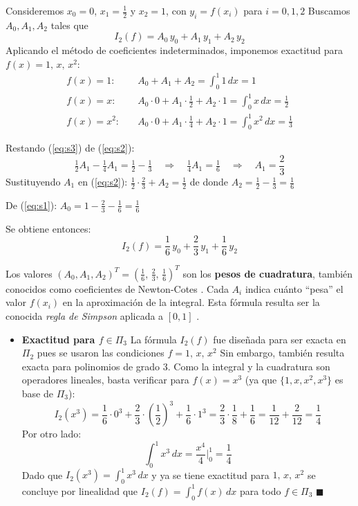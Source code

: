 \documentclass[12pt]{article}
\begin{document}
\begin{enumerate}
	Consideremos $x_0=0$, $x_1=\tfrac{1}{2}$ y $x_2=1$, con $y_i = f(x_i)$ para $i=0,1,2$ Buscamos $A_0, A_1, A_2$ tales que
	\[
	I_2(f) = A_0\,y_0 + A_1\,y_1 + A_2\,y_2
	\]
	Aplicando el método de coeficientes indeterminados, imponemos exactitud para $f(x) = 1,\, x,\, x^2$:
	\begin{align}
		f(x)=1:   &\quad A_0 + A_1 + A_2 = \int_0^1 1\,dx = 1 \label{eq:s1}\\[4pt]
		f(x)=x:   &\quad A_0\cdot 0 + A_1\cdot\tfrac{1}{2} + A_2\cdot 1 = \int_0^1 x\,dx = \tfrac{1}{2} \label{eq:s2}\\[4pt]
		f(x)=x^2: &\quad A_0\cdot 0 + A_1\cdot\tfrac{1}{4} + A_2\cdot 1 = \int_0^1 x^2\,dx = \tfrac{1}{3} \label{eq:s3}
	\end{align}

	Restando (\ref{eq:s3}) de (\ref{eq:s2}):
	\[
	\tfrac{1}{2}A_1 - \tfrac{1}{4}A_1 = \tfrac{1}{2} - \tfrac{1}{3} \quad\Longrightarrow\quad \tfrac{1}{4}A_1 = \tfrac{1}{6} \quad\Longrightarrow\quad A_1 = \frac{2}{3}
	\]
	Sustituyendo $A_1$ en (\ref{eq:s2}): $\tfrac{1}{2}\cdot\tfrac{2}{3} + A_2 = \tfrac{1}{2}$ de donde $A_2 = \tfrac{1}{2} - \tfrac{1}{3} = \tfrac{1}{6}$

	De (\ref{eq:s1}): $A_0 = 1 - \tfrac{2}{3} - \tfrac{1}{6} = \tfrac{1}{6}$

	Se obtiene entonces:
	\[
	\boxed{I_2(f) = \frac{1}{6}\,y_0 + \frac{2}{3}\,y_1 + \frac{1}{6}\,y_2}
	\]

	Los valores $(A_0,A_1,A_2)^T = \left(\tfrac{1}{6},\,\tfrac{2}{3},\,\tfrac{1}{6}\right)^T$ son los \textbf{pesos de cuadratura}, también conocidos como coeficientes de Newton-Cotes \cite{mathworld_newtoncotes}. Cada $A_i$ indica cuánto ``pesa'' el valor $f(x_i)$ en la aproximación de la integral. Esta fórmula resulta ser la conocida \textit{regla de Simpson} aplicada a $[0,1]$ \cite{cheney08, burden02}.

	\begin{itemize}
		\item \textbf{Exactitud para $f \in \Pi_3$} La fórmula $I_2(f)$ fue diseñada para ser exacta en $\Pi_2$ pues se usaron las condiciones $f=1,\,x,\,x^2$ Sin embargo, también resulta exacta para polinomios de grado 3. Como la integral y la cuadratura son operadores lineales, basta verificar para $f(x) = x^3$ (ya que $\{1,x,x^2,x^3\}$ es base de $\Pi_3$):
		\[
		I_2(x^3) = \frac{1}{6}\cdot 0^3 + \frac{2}{3}\cdot\left(\frac{1}{2}\right)^3 + \frac{1}{6}\cdot 1^3 = \frac{2}{3}\cdot\frac{1}{8} + \frac{1}{6} = \frac{1}{12} + \frac{2}{12} = \frac{1}{4}
		\]
		Por otro lado:
		\[
		\int_0^1 x^3\,dx = \frac{x^4}{4}\bigg|_0^1 = \frac{1}{4}
		\]
		Dado que $I_2(x^3) = \int_0^1 x^3\,dx$ y ya se tiene exactitud para $1,\,x,\,x^2$ se concluye por linealidad que $I_2(f) = \int_0^1 f(x)\,dx$ para todo $f\in\Pi_3$ $\blacksquare$


\end{itemize}
\end{enumerate}
\end{document}
